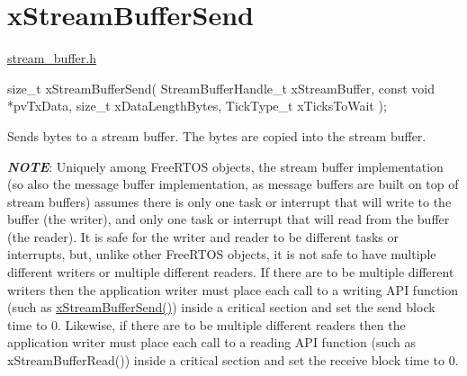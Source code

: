 \hypertarget{group__x_stream_buffer_send}{}\section{x\+Stream\+Buffer\+Send}
\label{group__x_stream_buffer_send}
\hyperlink{stream__buffer_8h}{stream\+\_\+buffer.\+h}


\begin{DoxyPre}
size\_t xStreamBufferSend( StreamBufferHandle\_t xStreamBuffer,
                          const void *pvTxData,
                          size\_t xDataLengthBytes,
                          TickType\_t xTicksToWait );

\begin{DoxyPre}\end{DoxyPre}
\end{DoxyPre}



\begin{DoxyPre}
\begin{DoxyPre}   Sends bytes to a stream buffer.  The bytes are copied into the stream buffer.\end{DoxyPre}
\end{DoxyPre}



\begin{DoxyPre}
\begin{DoxyPre}   {\itshape {\bfseries NOTE}}:  Uniquely among FreeRTOS objects, the stream buffer
   implementation (so also the message buffer implementation, as message buffers
   are built on top of stream buffers) assumes there is only one task or
   interrupt that will write to the buffer (the writer), and only one task or
   interrupt that will read from the buffer (the reader).  It is safe for the
   writer and reader to be different tasks or interrupts, but, unlike other
   FreeRTOS objects, it is not safe to have multiple different writers or
   multiple different readers.  If there are to be multiple different writers
   then the application writer must place each call to a writing API function
   (such as \hyperlink{stream__buffer_8h_a35cdf3b6bf677086b9128782f762499d}{xStreamBufferSend()}) inside a critical section and set the send
   block time to 0.  Likewise, if there are to be multiple different readers
   then the application writer must place each call to a reading API function
   (such as xStreamBufferRead()) inside a critical section and set the receive
   block time to 0.\end{DoxyPre}
\end{DoxyPre}




